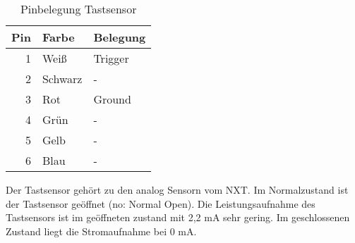 \begin{table}[!ht]
\centering
\rmfamily
\caption{Pinbelegung Tastsensor}
\renewcommand{\arraystretch}{1.1}
\sffamily
\begin{footnotesize}
\begin{tabular}{r | l l}
\toprule
\textbf{Pin} & \textbf{Farbe}  & \textbf{Belegung}\\
\midrule
1 & Weiß & Trigger \\
2 & Schwarz & - \\
3 & Rot & Ground \\
4 & Grün & - \\
5 & Gelb & - \\
6 & Blau & - \\
\bottomrule
\end{tabular}
\end{footnotesize}
\label{tastsensor:tbl}
\end{table}
Der Tastsensor gehört zu den analog Sensorn vom NXT. Im Normalzustand ist der Tastsensor geöffnet (no: Normal Open). Die Leistungsaufnahme des Tastsensors ist im geöffneten zustand mit 2,2 mA sehr gering. Im geschlossenen Zustand liegt die Stromaufnahme bei 0 mA.




